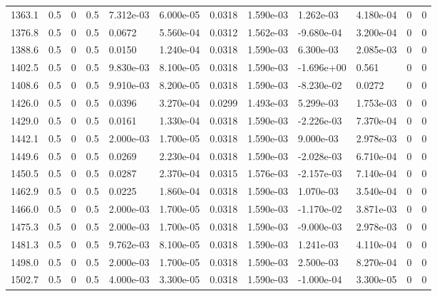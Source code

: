 \documentclass[preview]{standalone}
\begin{document}
{{{{\begin{tabular}{L{1.2cm}C{1.2cm} C{0.3cm}C{0.5cm} C{1.4cm}C{1.4cm} C{1.4cm}C{1.4cm} C{1.6cm}C{1.6cm} C{1.6cm}C{1.6cm}}
  1363.1  &   0.5  & 0     & 0.5 &  7.312e-03  & 6.000e-05  &  0.0318&   1.590e-03& 1.262e-03 & 4.180e-04   &  0 & 0  \\ 
  1376.8  &   0.5  & 0     & 0.5 &  0.0672  & 5.560e-04  &  0.0312&   1.562e-03& -9.680e-04 & 3.200e-04   &  0 & 0  \\ 
  1388.6  &   0.5  & 0     & 0.5 &  0.0150  & 1.240e-04  &  0.0318&   1.590e-03& 6.300e-03 & 2.085e-03   &  0 & 0  \\ 
  1402.5  &   0.5  & 0     & 0.5 &  9.830e-03  & 8.100e-05  &  0.0318&   1.590e-03& -1.696e+00 & 0.561   &  0 & 0  \\ 
  1408.6  &   0.5  & 0     & 0.5 &  9.910e-03  & 8.200e-05  &  0.0318&   1.590e-03& -8.230e-02 & 0.0272   &  0 & 0  \\ 
  1426.0  &   0.5  & 0     & 0.5 &  0.0396  & 3.270e-04  &  0.0299&   1.493e-03& 5.299e-03 & 1.753e-03   &  0 & 0  \\ 
  1429.0  &   0.5  & 0     & 0.5 &  0.0161  & 1.330e-04  &  0.0318&   1.590e-03& -2.226e-03 & 7.370e-04   &  0 & 0  \\ 
  1442.1  &   0.5  & 0     & 0.5 &  2.000e-03  & 1.700e-05  &  0.0318&   1.590e-03& 9.000e-03 & 2.978e-03   &  0 & 0  \\ 
  1449.6  &   0.5  & 0     & 0.5 &  0.0269  & 2.230e-04  &  0.0318&   1.590e-03& -2.028e-03 & 6.710e-04   &  0 & 0  \\ 
  1450.5  &   0.5  & 0     & 0.5 &  0.0287  & 2.370e-04  &  0.0315&   1.576e-03& -2.157e-03 & 7.140e-04   &  0 & 0  \\ 
  1462.9  &   0.5  & 0     & 0.5 &  0.0225  & 1.860e-04  &  0.0318&   1.590e-03& 1.070e-03 & 3.540e-04   &  0 & 0  \\ 
  1466.0  &   0.5  & 0     & 0.5 &  2.000e-03  & 1.700e-05  &  0.0318&   1.590e-03& -1.170e-02 & 3.871e-03   &  0 & 0  \\ 
  1475.3  &   0.5  & 0     & 0.5 &  2.000e-03  & 1.700e-05  &  0.0318&   1.590e-03& -9.000e-03 & 2.978e-03   &  0 & 0  \\ 
  1481.3  &   0.5  & 0     & 0.5 &  9.762e-03  & 8.100e-05  &  0.0318&   1.590e-03& 1.241e-03 & 4.110e-04   &  0 & 0  \\ 
  1498.0  &   0.5  & 0     & 0.5 &  2.000e-03  & 1.700e-05  &  0.0318&   1.590e-03& 2.500e-03 & 8.270e-04   &  0 & 0  \\ 
  1502.7  &   0.5  & 0     & 0.5 &  4.000e-03  & 3.300e-05  &  0.0318&   1.590e-03& -1.000e-04 & 3.300e-05   &  0 & 0  \\ 
\hline 
\end{tabular} 

}}}}
\end{document}

